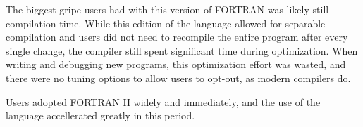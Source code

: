The biggest gripe users had with this version of FORTRAN was
likely still compilation time.
While this edition of the language allowed for separable compilation and users did not need to recompile
the entire program after every single change, the compiler still spent significant time
during optimization.
When writing and debugging new programs, this optimization effort was wasted, and
there were no tuning options to allow users to opt-out, as modern compilers do.

Users adopted FORTRAN II widely and immediately, and the use of the language
accellerated greatly in this period.
